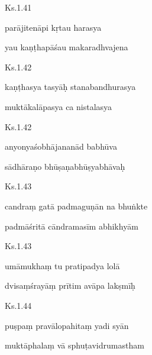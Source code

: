 \documentclass{tufte-handout}
\newenvironment{sanskrit}%
{\begin{otherlanguage}{sanskrit-devanagari}}%
{\end{otherlanguage}}
\begin{document}
    
	\begin{sanskrit}
	
	    
		Ks.1.41 
    
	    
		parājitenāpi kṛtau harasya 
    
	    
		yau kaṇṭhapāśau makaradhvajena 
    
	\end{sanskrit}

    
	\begin{sanskrit}
	
	    
		Ks.1.42 
    
	    
		kaṇṭhasya tasyāḥ stanabandhurasya 
    
	    
		muktākalāpasya ca nistalasya 
    
	\end{sanskrit}

    
	\begin{sanskrit}
	
	    
		Ks.1.42 
    
	    
		anyonyaśobhājananād babhūva 
    
	    
		sādhāraṇo bhūṣaṇabhūṣyabhāvaḥ 
    
	\end{sanskrit}

    
	\begin{sanskrit}
	
	    
		Ks.1.43 
    
	    
		candraṃ gatā padmaguṇān na bhuṅkte 
    
	    
		padmāśritā cāndramasīm abhikhyām 
    
	\end{sanskrit}

    
	\begin{sanskrit}
	
	    
		Ks.1.43 
    
	    
		umāmukhaṃ tu pratipadya lolā 
    
	    
		dvisaṃśrayāṃ prītim avāpa lakṣmīḥ 
    
	\end{sanskrit}

    
	\begin{sanskrit}
	
	    
		Ks.1.44 
    
	    
		puṣpaṃ pravālopahitaṃ yadi syān 
    
	    
		muktāphalaṃ vā sphuṭavidrumastham 
    
	\end{sanskrit}
\end{document}
